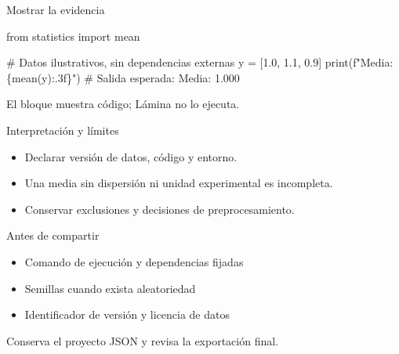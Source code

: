 \documentclass[aspectratio=169,11pt]{beamer}
\begin{document}
\begin{frame}[fragile]{Mostrar la evidencia}
  \transdissolve[duration=0.25]
  \begin{semiverbatim}
  from statistics import mean
  
  # Datos ilustrativos, sin dependencias externas
  y = [1.0, 1.1, 0.9]
  print(f"Media: \{mean(y):.3f\}")
  # Salida esperada: Media: 1.000
  \end{semiverbatim}
  \medskip

  {\small El bloque muestra código; Lámina no lo ejecuta.}
\end{frame}

\begin{frame}{Interpretación y límites}
  \transdissolve[duration=0.25]
  \begin{itemize}
    \item Declarar versión de datos, código y entorno.
    \item Una media sin dispersión ni unidad experimental es incompleta.
    \item Conservar exclusiones y decisiones de preprocesamiento.
  \end{itemize}
\end{frame}

\begin{frame}{Antes de compartir}
  \transdissolve[duration=0.25]
  \begin{itemize}
    \item Comando de ejecución y dependencias fijadas
    \item Semillas cuando exista aleatoriedad
    \item Identificador de versión y licencia de datos
  \end{itemize}
  \medskip

  {\small Conserva el proyecto JSON y revisa la exportación final.}
\end{frame}
\end{document}
